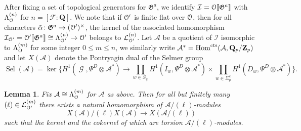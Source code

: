 \documentclass[leqno]{amsart}
\newtheorem{lem}[thm]{Lemma}
\theoremstyle{definition}
\theoremstyle{remark}
\newcommand{\eo}{\EuScript{O}}
\newcommand{\Q}{{\mathbf{Q}}}
\newcommand{\Qp}{\mathbf{Q}_p}
\newcommand{\Zp}{\mathbf{Z}_p}
\DeclareMathOperator{\Hom}{Hom}
\DeclareMathOperator{\Gal}{\mathcal{G}}
\newcommand{\cts}{\textnormal{cts}}
\newcommand{\F}{{\mathcal{F}}} %
\newcommand{\fG}{\mathfrak{G}}
\newcommand{\I}{\mathcal{I}} %
\DeclareMathOperator{\Sel}{Sel}
\newcommand{\lin}[1]{\mathcal{L}^{(#1)}}
\newcommand{\Lda}[1]{\Lambda^{(#1)}}
\begin{document}
After fixing a set of topological generators
for $\fG^a$, we identify 
$\I=\eo\llbracket\fG^a\rrbracket$
with $\Lda{n}_{\eo}$ for $n=[\F:\Q]$.
We note that if $\eo'$ is finite flat over $\eo$,
then for all characters
$\tilde{\alpha}\colon \fG^a\to (\eo')^\times$,
the kernel of the associated homomorphism
$\I_{\eo'}=\eo'\llbracket\fG^a\rrbracket\cong \Lda{n}_{\eo'}\to \eo'$
belongs to $\lin{n}_{\eo'}$.
Let $\mathcal{A}$ be a quotient of $\I$
isomorphic to $\Lda{m}_{\eo}$ for some integer $0\leq m\leq n$,
we similarly write $\mathcal{A}^*=\Hom^{\cts}(\mathcal{A},\Qp/\Zp)$
and let $X(\mathcal{A})$ denote the Pontryagin dual 
of the Selmer group
\[
\Sel(\mathcal{A})=
\ker\big\{
H^1(\Gal,\Psi^D\otimes \mathcal{A}^*)\to 
\prod_{w\in S_\psi}
H^1(I_w,\Psi^D\otimes \mathcal{A}^*)\times
\prod_{w\in \Sigma^c_p}
H^1(D_w,\Psi^D\otimes \mathcal{A}^*)
\big\}.
\]

\begin{lem}
Fix  $\mathcal{A}\cong \Lda{m}_{\eo}$
for  $\mathcal{A}$ as above.
Then for all but finitely many $(\ell)\in \lin{m}_{\eo'}$
there exists a natural homomorphism
of $\mathcal{A}/(\ell)$-modules
\[
    X(\mathcal{A})/(\ell)X(\mathcal{A})\to 
    X(\mathcal{A}/(\ell))
\]
such that the kernel and the cokernel of which 
are torsion $\mathcal{A}/(\ell)$-modules.

\end{lem}
\end{document}

